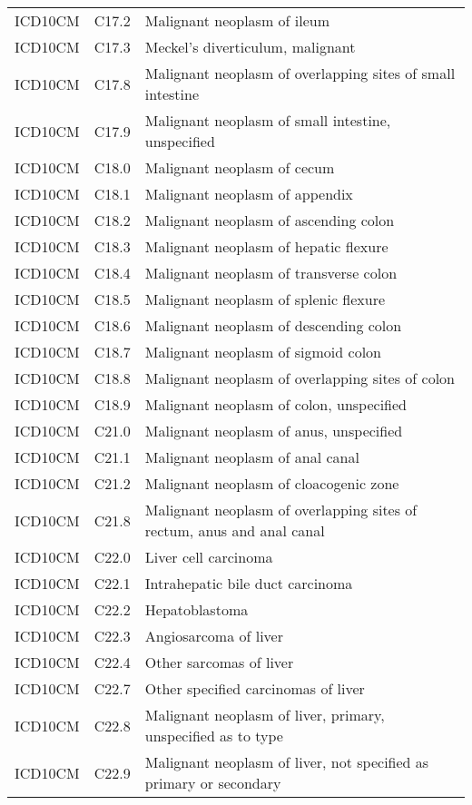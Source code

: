 \begin{longtable}{p{}p{}p{}}
  ICD10CM & C17.2 & Malignant neoplasm of ileum \\ 
  ICD10CM & C17.3 & Meckel's diverticulum, malignant \\ 
  ICD10CM & C17.8 & Malignant neoplasm of overlapping sites of small intestine \\ 
  ICD10CM & C17.9 & Malignant neoplasm of small intestine, unspecified \\ 
  ICD10CM & C18.0 & Malignant neoplasm of cecum \\ 
  ICD10CM & C18.1 & Malignant neoplasm of appendix \\ 
  ICD10CM & C18.2 & Malignant neoplasm of ascending colon \\ 
  ICD10CM & C18.3 & Malignant neoplasm of hepatic flexure \\ 
  ICD10CM & C18.4 & Malignant neoplasm of transverse colon \\ 
  ICD10CM & C18.5 & Malignant neoplasm of splenic flexure \\ 
  ICD10CM & C18.6 & Malignant neoplasm of descending colon \\ 
  ICD10CM & C18.7 & Malignant neoplasm of sigmoid colon \\ 
  ICD10CM & C18.8 & Malignant neoplasm of overlapping sites of colon \\ 
  ICD10CM & C18.9 & Malignant neoplasm of colon, unspecified \\ 
  ICD10CM & C21.0 & Malignant neoplasm of anus, unspecified \\ 
  ICD10CM & C21.1 & Malignant neoplasm of anal canal \\ 
  ICD10CM & C21.2 & Malignant neoplasm of cloacogenic zone \\ 
  ICD10CM & C21.8 & Malignant neoplasm of overlapping sites of rectum, anus and anal canal \\ 
  ICD10CM & C22.0 & Liver cell carcinoma \\ 
  ICD10CM & C22.1 & Intrahepatic bile duct carcinoma \\ 
  ICD10CM & C22.2 & Hepatoblastoma \\ 
  ICD10CM & C22.3 & Angiosarcoma of liver \\ 
  ICD10CM & C22.4 & Other sarcomas of liver \\ 
  ICD10CM & C22.7 & Other specified carcinomas of liver \\ 
  ICD10CM & C22.8 & Malignant neoplasm of liver, primary, unspecified as to type \\ 
  ICD10CM & C22.9 & Malignant neoplasm of liver, not specified as primary or secondary \\ 

\end{longtable}
